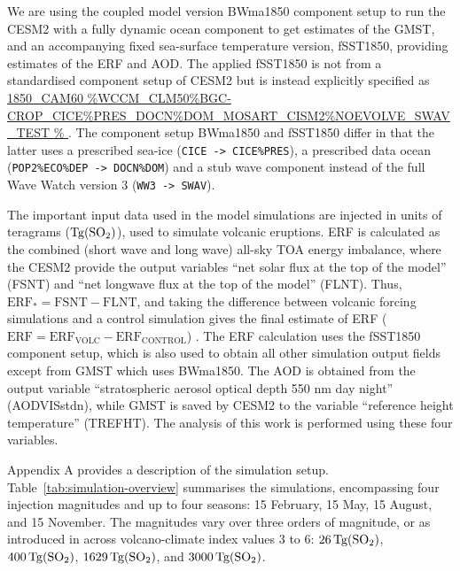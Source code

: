 \documentclass[draft]{agujournal2019}
\begin{document}

  We are using the coupled model version BWma1850 component setup to run the CESM2 with
  a fully dynamic ocean component to get estimates of the GMST, and an accompanying
  fixed sea-surface temperature version, fSST1850, providing estimates of the ERF and
  AOD. The applied fSST1850 is not from a standardised component setup of CESM2 but is
  instead explicitly specified as \url{1850_CAM60
  }. %
  The component setup BWma1850 and fSST1850 differ in that the latter uses a prescribed
  sea-ice (\texttt{CICE -> CICE\%PRES}), a prescribed data ocean (\texttt{POP2\%ECO\%DEP
    -> DOCN\%DOM}) and a stub wave component instead of the full Wave Watch version 3
  (\texttt{WW3 -> SWAV}).

  The important input data used in the model simulations are injected  in units
  of teragrams (\(\si{\tera\gram(\ce{SO2})}\)), used to simulate volcanic eruptions. ERF
  is calculated as the combined (short wave and long wave) all-sky TOA energy imbalance,
  where the CESM2 provide the output variables ``net solar flux at the top of the
  model'' (FSNT) and ``net longwave flux at the top of the model'' (FLNT). Thus,
  \(\mathrm{ERF_*}= \mathrm{FSNT} - \mathrm{FLNT}\), and taking the difference between
  volcanic forcing simulations and a control simulation gives the final estimate of ERF
  (\(\mathrm{ERF}=\mathrm{ERF_{VOLC}}-\mathrm{ERF_{CONTROL}}\)) \cite{marshall2020}. The
  ERF calculation uses the fSST1850 component setup, which is also used to obtain all
  other simulation output fields except from GMST which uses BWma1850. The AOD is
  obtained from the output variable ``stratospheric aerosol optical depth 550 nm day
  night'' (AODVISstdn), while GMST is saved by CESM2 to the variable ``reference height
  temperature'' (TREFHT). The analysis of this work is performed using these four
  variables.

  Appendix A provides a description of the simulation setup.
  Table~\ref{tab:simulation-overview} summarises the simulations, encompassing four
   injection magnitudes and up to four seasons: 15 February, 15 May, 15 August,
  and 15 November.  The magnitudes vary over three orders of
  magnitude, or as introduced in  across volcano-climate index values
  \(3\) to \(6\): \(\SI{26}{\tera\gram(\ce{SO2})}\), \(\SI{400}{\tera\gram(\ce{SO2})}\),
  \(\SI{1629}{\tera\gram(\ce{SO2})}\), and \(\SI{3000}{\tera\gram(\ce{SO2})}\).
\end{document}
